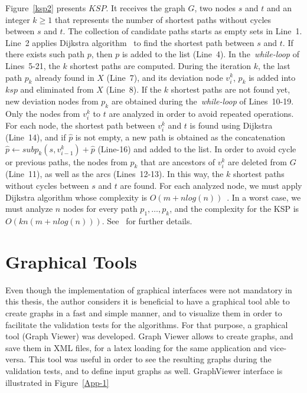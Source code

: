 Figure~\ref{ksp2} presents $KSP$. It receives the graph $G$, two nodes $s$ and $t$ and an integer $k \geq 1$ that 
represents the number of shortest paths without cycles between $s$ and $t$. 
The collection of candidate paths starts as empty sets in Line~1. Line~2 applies 
Dijkstra algorithm~\cite{20} to find the shortest path between $s$ and $t$. 
If there exists such path $p$, then $p$ is added to the list (Line~4). In the~\textit{while-loop} of Lines~5-21, the $k$ shortest paths are computed. During the iteration $k$, 
the last path $p_k$ already found in $X$ (Line~7), and its deviation node $v_{i}^{k}$, 
$p_k$ is added into $ksp$ and eliminated from $X$ (Line~8). If the $k$ shortest paths 
are not found yet, new deviation nodes from $p_k$ are obtained during the~\textit{while-loop} of Lines~10-19. Only the nodes from $v_{i}^{k}$ to $t$ are analyzed in order to avoid 
repeated operations. For each node, the shortest path between $v_{i}^{k}$ and $t$ is 
found using Dijkstra (Line~14), and if $\hat{p}$ is not empty, a new path 
is obtained as the concatenation $\hat{p} \leftarrow subp_k(s,v_{i-1}^{k}) + \hat{p}$ (Line-16) 
and added to the list. In order to avoid cycle or previous paths, the nodes from $p_k$ 
that are ancestors of $v_{i}^{k}$ are deleted from $G$ (Line~11), as well as the arcs (Lines~12-13).  In this way, the $k$ shortest paths without cycles between $s$ and $t$ 
are found. For each analyzed node, we must apply Dijkstra algorithm whose 
complexity is $O(m+nlog(n))$~\cite{20}. In a worst case, we must analyze $n$ nodes for 
every path $p_1,\ldots,p_k$, and the complexity for the KSP is $O(kn(m+nlog(n)))$. 
See~\cite{21} for further details.

\section{Graphical Tools}
Even though the implementation of graphical interfaces were not mandatory in this thesis, the author considers 
it is beneficial to have a graphical tool able to create graphs in a fast and simple manner, and to visualize them in order to facilitate the validation tests for the algorithms. For that purpose, a graphical tool 
(Graph Viewer) was developed. Graph Viewer allows to create graphs, and save them in XML files, for a 
latex loading for the same application and vice-versa. This tool was useful in order to see the resulting 
graphs during the validation tests, and to define input graphs as well. GraphViewer interface is illustrated 
in Figure~\ref{App-1}
 

